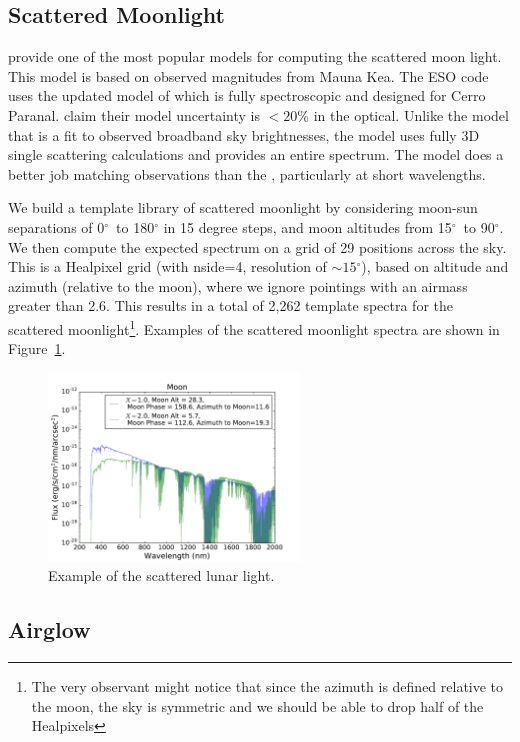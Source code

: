 \documentclass[]{spie}
\newcommand\degree{{^\circ}}
\begin{document}
\subsection{Scattered Moonlight}

\cite{Krisciunas91} provide one of the most popular models for computing the scattered moon light. This model is based on observed magnitudes from Mauna Kea. The ESO code uses the updated model of \cite{Jones13} which is fully spectroscopic and designed for Cerro Paranal. \cite{Jones13} claim their model uncertainty is $<20$\% in the optical.  Unlike the \cite{Krisciunas91} model that is a fit to observed broadband sky brightnesses, the \cite{Jones13} model uses fully 3D single scattering calculations and provides an entire spectrum. The \cite{Jones13} model does a better job matching observations than the \cite{Krisciunas91}, particularly at short wavelengths.

We build a template library of scattered moonlight by considering moon-sun separations of 0$\degree$\ to 180$\degree$ in 15 degree steps, and moon altitudes from 15$\degree$\ to 90$\degree$.  We then compute the expected spectrum on a grid of 29 positions across the sky. This is a Healpixel grid (with nside=4, resolution of $\sim15\degree$), based on altitude and azimuth (relative to the moon), where we ignore pointings with an airmass greater than 2.6. This results in a total of 2,262 template spectra for the scattered moonlight\footnote{The very observant might notice that since the azimuth is defined relative to the moon, the sky is symmetric and we should be able to drop half of the Healpixels}. Examples of the scattered moonlight spectra are shown in Figure~\ref{fig:moon}.

\begin{figure}
  \includegraphics[height=5cm]{plots/moon.pdf}
  \caption{Example of the scattered lunar light. \label{fig:moon}}
\end{figure}


\subsection{Airglow}
\end{document}
